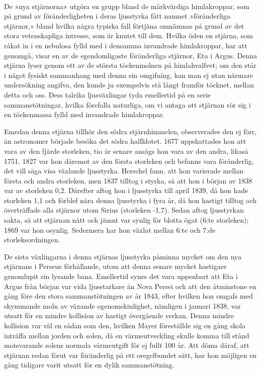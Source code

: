 \documentclass[a4paper, 12pt, oneside, swedish]{article}
\begin{document}
\paragraph{}
De »nya stjärnorna» utgöra en grupp bland de märkvärdiga himlakroppar, som på grund av föränderligheten i deras ljusstyrka fått namnet »föränderliga stjärnor,» bland hvilka några typiska fall förtjäna omnämnas på grund av det stora vetenskapliga intresse, som är knutet till dem. Hvilka öden en stjärna, som råkat in i en nebulosa fylld med i densamma invandrade himlakroppar, har att genomgå, visar en av de egendomligaste föränderliga stjärnor, Eta i Argus. Denna stjärna lyser genom ett av de största töckenmolnen på himlahvalfvet; om den står i något fysiskt sammanhang med denna sin omgifning, kan man ej utan närmare undersökning angifva, den kunde ju exempelvis stå långt framför töcknet, mellan detta och oss. Dess talrika ljusväxlingar tyda emellertid på en serie sammanstötningar, hvilka förefalla naturliga, om vi antaga att stjärnan rör sig i en töckenmassa fylld med invandrade himlakroppar.

Emedan denna stjärna tillhör den södra stjärnhimmelen, observerades den ej förr, än astronomer började besöka det södra halfklotet. 1677 uppskattades hon att vara av den fjärde storleken, tio år senare ansågs hon vara av den andra, likaså 1751. 1827 var hon däremot av den första storleken och befanns vara föränderlig, det vill säga visa växlande ljusstyrka. Herschel fann, att hon varierade mellan första och andra storleken, men 1837 tilltog i styrka, så att hon i början av 1838 var av storleken 0,2. Därefter aftog hon i ljusstyrka till april 1839, då hon hade storleken 1,1 och förblef nära denna ljusstyrka i fyra år, då hon hastigt tilltog och överträffade alla stjärnor utom Sirius (storleken -1,7). Sedan aftog ljusstyrkan sakta, så att stjärnan nätt och jämnt var synlig för blotta ögat (6:te storleken); 1869 var hon osynlig. Sedermera har hon växlat mellan 6:te och 7:de storleksordningen.

De sista växlingarna i denna stjärnas ljusstyrka påminna mycket om den nya stjärnans i Perseus förhållande, utom att denna senare mycket hastigare genomlupit sin lysande bana. Emellertid synes det vara uppenbart att Eta i Argus från början var vida ljusstarkare än Nova Persei och att den åtminstone en gång före den stora sammanstötningen av år 1843, efter hvilken hon omgafs med skymmande moln av växande ogenomskinlighet, nämligen i januari 1838, var utsatt för en mindre kollision av hastigt övergående verkan. Denna mindre kollision var väl en sådan som den, hvilken Mayer föreställde sig en gång skola inträffa mellan jorden och solen, då en värmeutveckling skulle komma till stånd motsvarande solens normala värmeutgift för ej fullt 100 år. Att döma däraf, att stjärnan redan förut var föränderlig på ett oregelbundet sätt, har hon möjligen en gång tidigare varit utsatt för en dylik sammanstötning.
\end{document}
